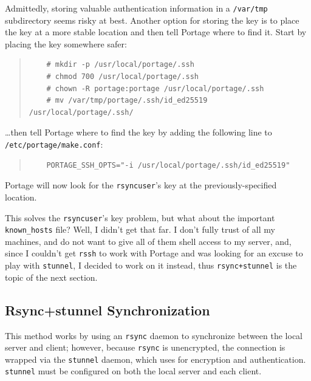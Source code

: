 \documentclass{article}
\begin{document}
Admittedly, storing valuable authentication information in a \texttt{/var/tmp} subdirectory seems risky at best.  Another option for storing the key is to place the key at a more stable location and then tell Portage where to find it.  Start by placing the key somewhere safer:
\begin{quote}
\begin{verbatim}
	# mkdir -p /usr/local/portage/.ssh
	# chmod 700 /usr/local/portage/.ssh
	# chown -R portage:portage /usr/local/portage/.ssh
	# mv /var/tmp/portage/.ssh/id_ed25519 /usr/local/portage/.ssh/
\end{verbatim}
\end{quote}
\ldots then tell Portage where to find the key by adding the following line to \texttt{/etc/portage/make.conf}:
\begin{quote}
\begin{verbatim}
	PORTAGE_SSH_OPTS="-i /usr/local/portage/.ssh/id_ed25519"
\end{verbatim}
\end{quote}
Portage will now look for the \texttt{rsyncuser}'s key at the previously-specified location.

This solves the \texttt{rsyncuser}'s key problem, but what about the important \texttt{known_hosts} file?  Well, I didn't get that far.  I don't fully trust of all my machines, and do not want to give all of them shell access to my server, and, since I couldn't get \texttt{rssh} to work with Portage and was looking for an excuse to play with \texttt{stunnel}, I decided to work on it instead, thus \texttt{rsync+stunnel} is the topic of the next section.

\subsection{Rsync+stunnel Synchronization}
This method works by using an \texttt{rsync} daemon to synchronize between the local server and client; however, because \texttt{rsync} is unencrypted, the connection is wrapped via the \texttt{stunnel} daemon, which uses  for encryption and authentication.  \texttt{stunnel} must be configured on both the local server and each client.
\end{document}
